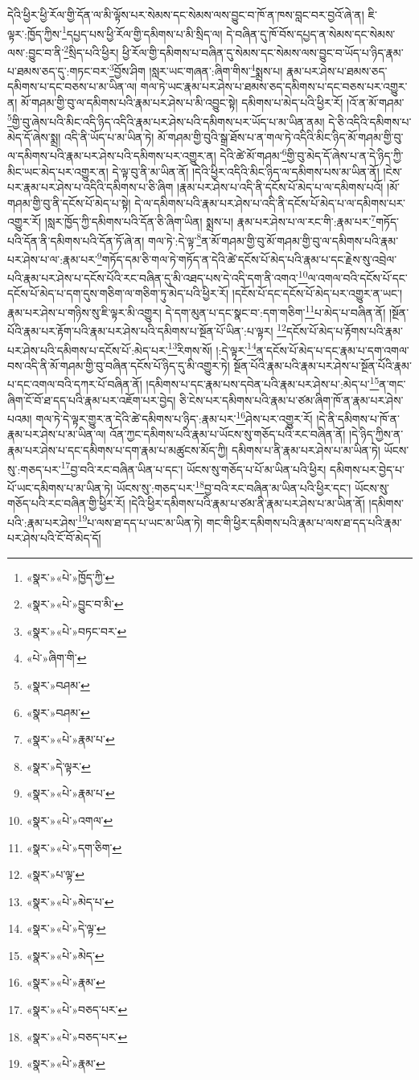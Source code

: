 དེའི་ཕྱིར་ཕྱི་རོལ་གྱི་དོན་ལ་མི་ལྟོས་པར་སེམས་དང་སེམས་ལས་བྱུང་བ་ཁོ་ན་ཁས་བླང་བར་བྱའོ་ཞེ་ན། ཇི་ལྟར་:ཁྱོད་ཀྱིས་\footnote{«སྣར་»«པེ་»ཁྱོད་ཀྱི་}དཔྱད་པས་ཕྱི་རོལ་གྱི་དམིགས་པ་མི་སྲིད་ལ། དེ་བཞིན་དུ་ཁོ་བོས་དཔྱད་ན་སེམས་དང་སེམས་ལས་:བྱུང་བ་ནི་\footnote{«སྣར་»«པེ་»བྱུང་བ་མི་}སྲིད་པའི་ཕྱིར། ཕྱི་རོལ་གྱི་དམིགས་པ་བཞིན་དུ་སེམས་དང་སེམས་ལས་བྱུང་བ་ཡོད་པ་ཉིད་རྣམ་པ་ཐམས་ཅད་དུ་:གཏང་བར་\footnote{«སྣར་»«པེ་»བཏང་བར་}བྱོས་ཤིག །སླར་ཡང་གཞན་:ཞིག་གིས་\footnote{«པེ་»ཞིག་གི་}སྨྲས་པ། རྣམ་པར་ཤེས་པ་ཐམས་ཅད་དམིགས་པ་དང་བཅས་པ་མ་ཡིན་ལ། གལ་ཏེ་ཡང་རྣམ་པར་ཤེས་པ་ཐམས་ཅད་དམིགས་པ་དང་བཅས་པར་འགྱུར་ན། མོ་གཤམ་གྱི་བུ་ལ་དམིགས་པའི་རྣམ་པར་ཤེས་པ་མི་འབྱུང་སྟེ། དམིགས་པ་མེད་པའི་ཕྱིར་རོ། །འོ་ན་མོ་གཤམ་\footnote{«སྣར་»བཤམ་}གྱི་བུ་ཞེས་པའི་མིང་འདི་ཉིད་འདིའི་རྣམ་པར་ཤེས་པའི་དམིགས་པར་ཡོད་པ་མ་ཡིན་ནམ། དེ་ཅི་འདིའི་དམིགས་པ་མེད་དོ་ཞེས་སྨྲ། འདི་ནི་ཡོད་པ་མ་ཡིན་ཏེ། མོ་གཤམ་གྱི་བུའི་སྒྲ་ཐོས་པ་ན་གལ་ཏེ་འདིའི་མིང་ཉིད་མོ་གཤམ་གྱི་བུ་ལ་དམིགས་པའི་རྣམ་པར་ཤེས་པའི་དམིགས་པར་འགྱུར་ན། དེའི་ཚེ་མོ་གཤམ་\footnote{«སྣར་»བཤམ་}གྱི་བུ་མེད་དོ་ཞེས་པ་ན་དེ་ཉིད་ཀྱི་མིང་ཡང་མེད་པར་འགྱུར་ན། དེ་ལྟ་བུ་ནི་མ་ཡིན་ནོ། །དེའི་ཕྱིར་འདིའི་མིང་ཉིད་ལ་དམིགས་པས་མ་ཡིན་ནོ། །ངེས་པར་རྣམ་པར་ཤེས་པ་འདིའི་དམིགས་པ་ཅི་ཞིག །རྣམ་པར་ཤེས་པ་འདི་ནི་དངོས་པོ་མེད་པ་ལ་དམིགས་པའོ། །མོ་གཤམ་གྱི་བུ་ནི་དངོས་པོ་མེད་པ་སྟེ། དེ་ལ་དམིགས་པའི་རྣམ་པར་ཤེས་པ་འདི་ནི་དངོས་པོ་མེད་པ་ལ་དམིགས་པར་འགྱུར་རོ། །སླར་ཁྱོད་ཀྱི་དམིགས་པའི་དོན་ཅི་ཞིག་ཡིན། སྨྲས་པ། རྣམ་པར་ཤེས་པ་ལ་རང་གི་:རྣམ་པར་\footnote{«སྣར་»«པེ་»རྣམ་པ་}གཏོད་པའི་དོན་ནི་དམིགས་པའི་དོན་ཏོ་ཞེ་ན། གལ་ཏེ་:དེ་ལྟ་\footnote{«སྣར་»དེ་ལྟར་}ན་མོ་གཤམ་གྱི་བུ་མོ་གཤམ་གྱི་བུ་ལ་དམིགས་པའི་རྣམ་པར་ཤེས་པ་ལ་:རྣམ་པར་\footnote{«སྣར་»«པེ་»རྣམ་པ་}གཏོད་དམ་ཅི་གལ་ཏེ་གཏོད་ན་དེའི་ཚེ་དངོས་པོ་མེད་པའི་རྣམ་པ་དང་རྗེས་སུ་འབྲེལ་པའི་རྣམ་པར་ཤེས་པ་དངོས་པོའི་རང་བཞིན་དུ་མི་འཐད་པས་དེ་འདི་དག་ནི་འགའ་\footnote{«སྣར་»«པེ་»འགལ་}ལ་འགལ་བའི་དངོས་པོ་དང་དངོས་པོ་མེད་པ་དག་དུས་གཅིག་ལ་གཅིག་ཏུ་མེད་པའི་ཕྱིར་རོ། །དངོས་པོ་དང་དངོས་པོ་མེད་པར་འགྱུར་ན་ཡང་། རྣམ་པར་ཤེས་པ་གཉིས་སུ་ཇི་ལྟར་མི་འགྱུར། དེ་དག་མུན་པ་དང་སྣང་བ་:དག་གཅིག་\footnote{«སྣར་»«པེ་»དག་ཅིག་}པ་མེད་པ་བཞིན་ནོ། །སྔོན་པོའི་རྣམ་པར་རྟོག་པའི་རྣམ་པར་ཤེས་པའི་དམིགས་པ་སྔོན་པོ་ཡིན་:པ་ལྟར། \footnote{«སྣར་»པ་ལྟ་}དངོས་པོ་མེད་པ་རྟོགས་པའི་རྣམ་པར་ཤེས་པའི་དམིགས་པ་དངོས་པོ་:མེད་པར་\footnote{«སྣར་»«པེ་»མེད་པ་}རིགས་སོ། །:དེ་ལྟར་\footnote{«སྣར་»«པེ་»དེ་ལྟ་}ན་དངོས་པོ་མེད་པ་དང་རྣམ་པ་དག་འགལ་བས་འདི་ནི་མོ་གཤམ་གྱི་བུ་བཞིན་དངོས་པོ་ཉིད་དུ་མི་འགྱུར་ཏེ། སྔོན་པོའི་རྣམ་པའི་རྣམ་པར་ཤེས་པ་སྔོན་པོའི་རྣམ་པ་དང་འགལ་བའི་དཀར་པོ་བཞིན་ནོ། །དམིགས་པ་དང་རྣམ་པས་དབེན་པའི་རྣམ་པར་ཤེས་པ་:མེད་པ་\footnote{«སྣར་»«པེ་»མེད་}ན་གང་ཞིག་ངོ་བོ་ཐ་དད་པའི་རྣམ་པར་འཇོག་པར་བྱེད། ཅི་ངེས་པར་དམིགས་པའི་རྣམ་པ་ཙམ་ཞིག་ཁོ་ན་རྣམ་པར་ཤེས་པའམ། གལ་ཏེ་དེ་ལྟར་གྱུར་ན་དེའི་ཚེ་དམིགས་པ་ཉིད་:རྣམ་པར་\footnote{«སྣར་»«པེ་»རྣམ་}ཤེས་པར་འགྱུར་རོ། །དེ་ནི་དམིགས་པ་ཁོ་ན་རྣམ་པར་ཤེས་པ་མ་ཡིན་ལ། འོན་ཀྱང་དམིགས་པའི་རྣམ་པ་ཡོངས་སུ་གཅོད་པའི་རང་བཞིན་ནོ། །དེ་ཉིད་ཀྱིས་ན་རྣམ་པར་ཤེས་པ་དང་དམིགས་པ་དག་རྣམ་པ་མཚུངས་མོད་ཀྱི། དམིགས་པ་ནི་རྣམ་པར་ཤེས་པ་མ་ཡིན་ཏེ། ཡོངས་སུ་:གཅད་པར་\footnote{«སྣར་»«པེ་»བཅད་པར་}བྱ་བའི་རང་བཞིན་ཡིན་པ་དང་། ཡོངས་སུ་གཅོད་པ་པོ་མ་ཡིན་པའི་ཕྱིར། དམིགས་པར་བྱེད་པ་པོ་ཡང་དམིགས་པ་མ་ཡིན་ཏེ། ཡོངས་སུ་:གཅད་པར་\footnote{«སྣར་»«པེ་»བཅད་པར་}བྱ་བའི་རང་བཞིན་མ་ཡིན་པའི་ཕྱིར་དང་། ཡོངས་སུ་གཅོད་པའི་རང་བཞིན་གྱི་ཕྱིར་རོ། །དེའི་ཕྱིར་དམིགས་པའི་རྣམ་པ་ཙམ་ནི་རྣམ་པར་ཤེས་པ་མ་ཡིན་ནོ། །དམིགས་པའི་:རྣམ་པར་ཤེས་\footnote{«སྣར་»«པེ་»རྣམ་}པ་ལས་ཐ་དད་པ་ཡང་མ་ཡིན་ཏེ། གང་གི་ཕྱིར་དམིགས་པའི་རྣམ་པ་ལས་ཐ་དད་པའི་རྣམ་པར་ཤེས་པའི་ངོ་བོ་མེད་དོ། 
